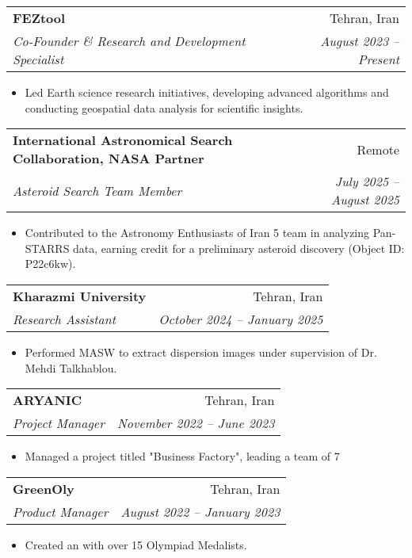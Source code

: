 \documentclass[letterpaper,11pt]{article}
\makeatletter
\newcommand{\resitem}[1]{\item #1 \vspace{-2pt}}
\newcommand{\ressubheading}[4]{%
	\begin{tabular*}{\textwidth}{l@{\cftdotfill{\cftsecdotsep}\extracolsep{\fill}}r}
		\textbf{#1} & #2 \\
		\textit{#3} & \textit{#4} \\
	\end{tabular*}\vspace{-8pt}
}
\makeatother
\begin{document}
		\vspace{-0.78em} 
		\ressubheading{FEZtool}{Tehran, Iran}{Co-Founder \& Research and Development Specialist}{August 2023 – Present}
		\begin{itemize}[topsep=7.5pt,partopsep=0pt,itemsep=3.5pt,parsep=0pt]
			\resitem{Led Earth science research initiatives, developing advanced algorithms and conducting geospatial data analysis for scientific insights.}
			
		\end{itemize}
		\vspace{-0.50em}
		\ressubheading{International Astronomical Search Collaboration, NASA Partner}{Remote}{Asteroid Search Team Member}{July 2025 – August 2025}
		\begin{itemize}[topsep=7.5pt,partopsep=0pt,itemsep=3.5pt,parsep=0pt]
			\resitem{Contributed to the Astronomy Enthusiasts of Iran 5 team in analyzing Pan-STARRS data, earning credit for a preliminary asteroid discovery (Object ID: P22c6kw).}
		\end{itemize}
		\vspace{-0.50em}  
		\ressubheading{Kharazmi University}{Tehran, Iran}{Research Assistant}{October 2024 – January 2025}
		\begin{itemize}[topsep=7.5pt,partopsep=0pt,itemsep=3.5pt,parsep=0pt]
			\resitem{Performed MASW to extract dispersion images under supervision of Dr. Mehdi Talkhablou.}
		\end{itemize}
		\vspace{-0.50em} 
		\ressubheading{ARYANIC}{Tehran, Iran}{Project Manager}{November 2022 – June 2023}
		\begin{itemize}[topsep=7.5pt,partopsep=0pt,itemsep=3.5pt,parsep=0pt]
			\resitem{Managed a project titled "Business Factory", leading a team of 7}
		\end{itemize}
		\vspace{-0.50em} 
		\ressubheading{GreenOly}{Tehran, Iran}{Product Manager}{August 2022 – January 2023}
		\begin{itemize}[topsep=7.5pt,partopsep=0pt,itemsep=3.5pt,parsep=0pt]
			\resitem{Created an
				\href{https://aradfarahani.com/MOOC/}{\dotuline{Entrepreneurship MOOC}} with over 15 Olympiad Medalists.}
			
		\end{itemize}
		\vspace{+1.1em} 
		
		
\end{document}
